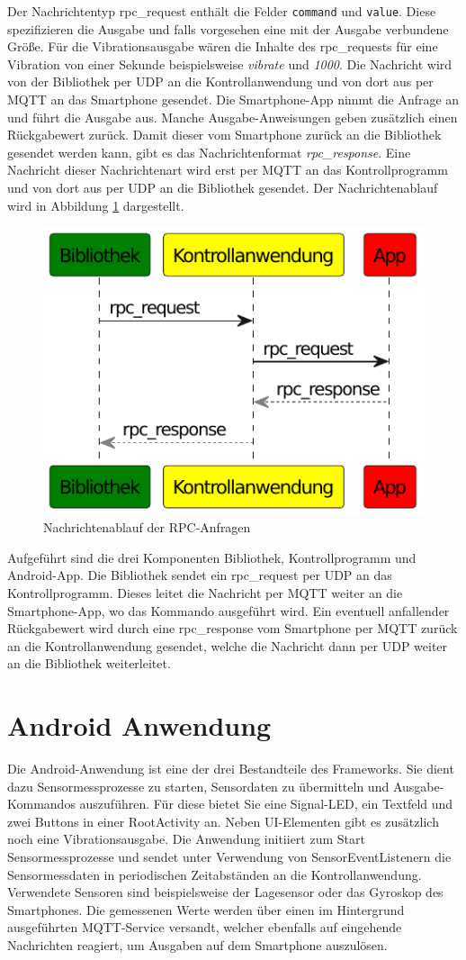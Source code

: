 \documentclass[11pt,a4paper]{report}
\begin{document}
Der Nachrichtentyp rpc\_request enthält die Felder \texttt{command} und \texttt{value}.
Diese spezifizieren die Ausgabe und falls vorgesehen eine mit der Ausgabe verbundene Größe.
Für die Vibrationsausgabe wären die Inhalte des rpc\_requests für eine Vibration von einer Sekunde beispielsweise \textit{vibrate} und \textit{1000}.
Die Nachricht wird von der Bibliothek per UDP an die Kontrollanwendung und von dort aus per MQTT an das Smartphone gesendet.
Die Smartphone-App nimmt die Anfrage an und führt die Ausgabe aus.
Manche Ausgabe-Anweisungen geben zusätzlich einen Rückgabewert zurück.
Damit dieser vom Smartphone zurück an die Bibliothek gesendet werden kann, gibt es das Nachrichtenformat \textit{rpc\_response}.
Eine Nachricht dieser Nachrichtenart wird erst per MQTT an das Kontrollprogramm und von dort aus per UDP an die Bibliothek gesendet.
Der Nachrichtenablauf wird in Abbildung \ref{fig:message_flow_rpc} dargestellt.
\begin{figure}[htbp]
\centering
\includegraphics[width=.6\textwidth]{images/message_flow_rpc.pdf}
\caption{Nachrichtenablauf der RPC-Anfragen}
\label{fig:message_flow_rpc}
\end{figure}
Aufgeführt sind die drei Komponenten Bibliothek, Kontrollprogramm und Android-App.
Die Bibliothek sendet ein rpc\_request per UDP an das Kontrollprogramm.
Dieses leitet die Nachricht per MQTT weiter an die Smartphone-App, wo das Kommando ausgeführt wird.
Ein eventuell anfallender Rückgabewert wird durch eine rpc\_response vom Smartphone per MQTT zurück an die Kontrollanwendung gesendet, welche die Nachricht dann per UDP weiter an die Bibliothek weiterleitet.


\chapter{Android Anwendung}\label{chap:app}
Die Android-Anwendung ist eine der drei Bestandteile des Frameworks.
Sie dient dazu Sensormessprozesse zu starten, Sensordaten zu übermitteln und Ausgabe-Kommandos auszuführen.
Für diese bietet Sie eine Signal-LED, ein Textfeld und zwei Buttons in einer RootActivity an.
Neben UI-Elementen gibt es zusätzlich noch eine Vibrationsausgabe. 
Die Anwendung initiiert zum Start Sensormessprozesse und sendet unter Verwendung von SensorEventListenern die Sensormessdaten in periodischen Zeitabständen an die Kontrollanwendung.
Verwendete Sensoren sind beispielsweise der Lagesensor oder das Gyroskop des Smartphones.
Die gemessenen Werte werden über einen im Hintergrund ausgeführten MQTT-Service versandt, welcher ebenfalls auf eingehende Nachrichten reagiert, um Ausgaben auf dem Smartphone auszulösen.
\end{document}
